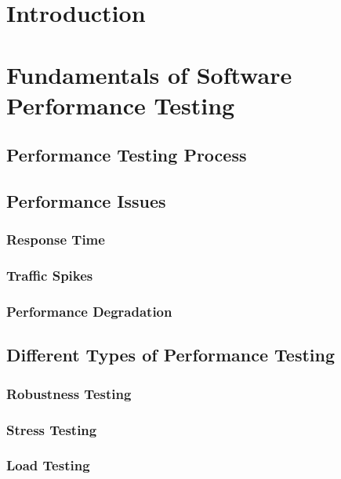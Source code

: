 
\chapter{Introduction}

\chapter{Fundamentals of Software Performance Testing}

\section{Performance Testing Process}

\section{Performance Issues}

\subsection{Response Time}

\subsection{Traffic Spikes}

\subsection{Performance Degradation}

\section{Different Types of Performance Testing}

\subsection*{Robustness Testing}

\subsection*{Stress Testing}

\subsection*{Load Testing}

